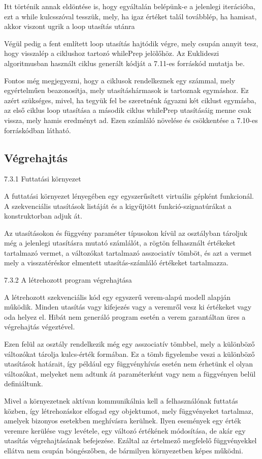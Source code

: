 Itt történik annak eldöntése is, hogy egyáltalán belépünk-e a jelenlegi iterációba, ezt a while kulcsszóval tesszük, mely, ha igaz értéket talál továbblép, ha hamisat, akkor viszont ugrik a loop utasítás utánra 

Végül pedig a fent említett loop utasítás hajtódik végre, mely csupán annyit tesz, hogy visszalép a ciklushoz tartozó whilePrep jelölőhöz. Az Euklideszi algoritmusban használt ciklus generált kódját a 7.11-es forráskód mutatja be.

Fontos még megjegyezni, hogy a ciklusok rendelkeznek egy számmal, mely egyértelműen beazonosítja, mely utasításhármasok is tartoznak egymáshoz. Ez azért szükséges, mivel, ha tegyük fel be szeretnénk ágyazni két ciklust egymásba, az első ciklus loop utasítása a második ciklus whilePrep utasításáig menne csak vissza, mely hamis eredményt ad. Ezen számláló növelése és csökkentése a 7.10-es forráskódban látható.

\subsection{Végrehajtás}

7.3.1 Futtatási környezet

A futtatási környezet lényegében egy egyszerűsített virtuális gépként funkcionál. A szekvenciális utasítások listáját és a kigyűjtött funkció-szignatúrákat a konstruktorban adjuk át.

Az utasításokon és függvény paraméter típusokon kívül az osztályban tároljuk még a jelenlegi utasításra mutató számlálót, a rögtön felhasznált értékeket tartalmazó vermet, a változókat tartalmazó asszociatív tömböt, és azt a vermet mely a visszatéréskor elmentett utasítás-számláló értékeket tartalmazza.

7.3.2 A létrehozott program végrehajtása

A létrehozott szekvenciális kód egy egyszerű verem-alapú modell alapján működik. Minden utasítás vagy kifejezés vagy a veremről vesz ki értékeket vagy oda helyez el. Hibát nem generáló program esetén a verem garantáltan üres a végrehajtás végeztével.

Ezen felül az osztály rendelkezik még egy asszociatív tömbbel, mely a különböző változókat tárolja kulcs-érték formában. Ez a tömb figyelembe veszi a különböző utasítások határait, így például egy függvényhívás esetén nem érhetünk el olyan változókat, melyeket nem adtunk át paraméterként vagy nem a függvényen belül definiáltunk.

Mivel a környezetnek aktívan kommunikálnia kell a felhasználónak futtatás közben, így létrehozáskor elfogad egy objektumot, mely függvényeket tartalmaz, amelyek bizonyos esetekben meghívásra kerülnek. Ilyen események egy érték veremre kerülése vagy levétele, egy változó értékének módosítása, de akár egy utasítás végrehajtásának befejezése. Ezáltal az értelmező megfelelő függvényekkel ellátva nem csupán böngészőben, de bármilyen környezetben képes működni.

